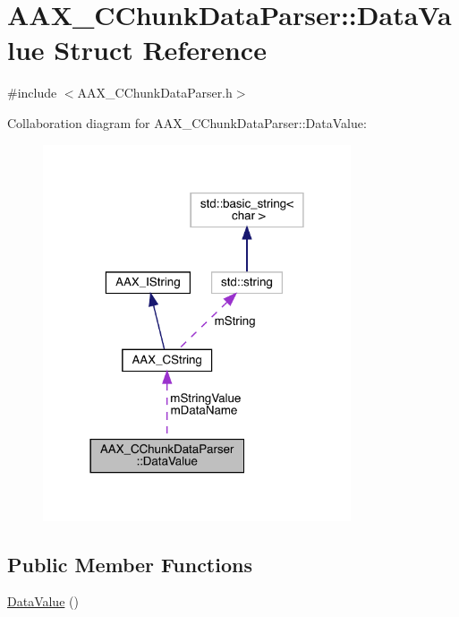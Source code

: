 \hypertarget{a01465}{}\section{A\+A\+X\+\_\+\+C\+Chunk\+Data\+Parser\+::Data\+Value Struct Reference}
\label{a01465}


{\ttfamily \#include $<$A\+A\+X\+\_\+\+C\+Chunk\+Data\+Parser.\+h$>$}



Collaboration diagram for A\+A\+X\+\_\+\+C\+Chunk\+Data\+Parser\+::Data\+Value\+:
\nopagebreak
\begin{figure}[H]
\begin{center}
\leavevmode
\includegraphics[width=258pt]{a01463}
\end{center}
\end{figure}
\subsection*{Public Member Functions}
\begin{DoxyCompactItemize}
\item 
\mbox{\hyperlink{a01465_a987366216b93c23f40b8b040412ee2dd}{Data\+Value}} ()
\end{DoxyCompactItemize}
